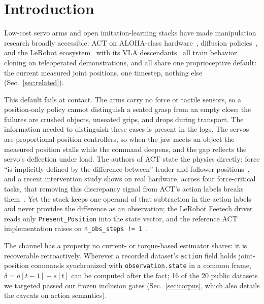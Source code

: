 \documentclass{article}
\begin{document}
\section{Introduction}
\label{sec:intro}

Low-cost servo arms and open imitation-learning stacks have made
manipulation research broadly accessible: ACT on ALOHA-class
hardware~\citep{zhao2023act}, diffusion policies~\citep{chi2023diffusion},
and the LeRobot ecosystem~\citep{cadene2024lerobot} with its VLA
descendants~\citep{kim2024openvla, black2024pi0, shukor2025smolvla,
nvidia2025groot} all train behavior cloning on teleoperated
demonstrations, and all share one proprioceptive default: the current
measured joint positions, one timestep, nothing else
(Sec.~\ref{sec:related}).

This default fails at contact. The arms carry no force or tactile sensors,
so a position-only policy cannot distinguish a seated grasp from an empty
close; the failures are crushed objects, unseated grips, and drops during
transport. The information needed to distinguish these cases is present
in the logs. The servos are proportional position controllers, so when the jaw meets an object the measured position stalls
while the command deepens, and the gap reflects the servo's deflection
under load. The authors of ACT state the physics directly: force ``is
implicitly defined by the difference between'' leader and follower
positions~\citep{zhao2023act}, and a recent intervention study shows on real
hardware, across four force-critical tasks, that removing this
discrepancy signal from ACT's action labels breaks
them~\citep{wong2026beyond}. Yet the stack keeps one
operand of that subtraction in the action labels and never provides the
difference as an observation; the LeRobot Feetech driver reads only
\texttt{Present\_Position} into the state vector, and the reference ACT
implementation raises on \texttt{n\_obs\_steps != 1}~\citep{cadene2024lerobot}.

The channel has a property no current- or torque-based estimator shares:
it is recoverable retroactively. Wherever a recorded dataset's
\texttt{action} field holds joint-position commands synchronized with
\texttt{observation.state} in a common frame,
$\delta = a[t{-}1] - s[t]$ can be computed after the fact; 16 of the 20
public datasets we targeted passed our frozen inclusion gates
(Sec.~\ref{sec:corpus}, which also details the caveats on action
semantics).
\end{document}
